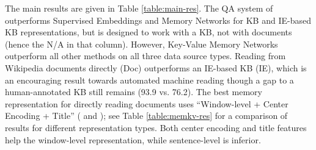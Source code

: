 \documentclass[11pt,letterpaper]{article}
\newcommand{\WikiMovies}{{\sc WikiMovies}\xspace}
\begin{document}
The main results are given in Table \ref{table:main-res}.
The  QA system of \cite{bordes2014question} outperforms Supervised Embeddings
and Memory Networks for KB and IE-based KB representations, but is designed
to work with a KB, not with documents (hence the N/A in that column).
However, Key-Value Memory Networks outperform all other methods
on all three data source types.
Reading from Wikipedia documents directly (Doc) outperforms an IE-based KB (IE),
which is an encouraging result towards automated machine reading though a
gap to a human-annotated KB still remains (93.9 vs. 76.2).
The best memory representation for directly reading
documents uses ``Window-level + Center Encoding + Title''
( and );
see Table \ref{table:memkv-res} for a comparison of results for different
representation types.
Both center encoding and title features help the window-level representation, while
sentence-level is inferior.

\begin{table}[t!]
	\begin{center}
    	\caption{
	\label{table:breakdown}
{Breakdown of test results (\% hits@1) on \WikiMovies for
Key-Value Memory Networks
using different
knowledge representations.}}
 	\end{center}
\end{table}
\end{document}
